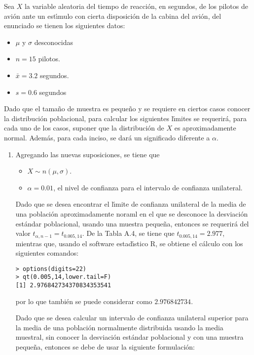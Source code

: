 \begin{solucion}
 Sea $X$ la variable aleatoria del tiempo de reacci\'on, en segundos, de los pilotos de avi\'on ante un est\'{\i}mulo con cierta disposici\'on de la cabina del avi\'on, del enunciado se tienen los siguientes datos:
 \begin{itemize}
  \item $\mu$ y $\sigma$ desconocidas
  \item $n = 15$ pilotos.
  \item $\bar{x} = 3.2$ segundos.
  \item $s = 0.6$ segundos
 \end{itemize}
 Dado que el tama\~no de muestra es peque\~no y se requiere en ciertos casos conocer la distribuci\'on poblacional, para calcular los siguientes l\'{\i}mites se requerir\'a, para cada uno de los casos, suponer que la distribuci\'on de $X$ es aproximadamente normal. Adem\'as, para cada inciso, se dar\'a un significado diferente a $\alpha$.
 \begin{enumerate}
  \item Agregando las nuevas suposiciones, se tiene que
  \begin{itemize}
   \item $X \sim n(\mu, \sigma)$.
   \item $\alpha = 0.01$, el nivel de confianza para el intervalo de confianza unilateral.
  \end{itemize}
  Dado que se desea encontrar el l\'{\i}mite de confianza unilateral de la media de una poblaci\'on aproximadamente noraml en el que se desconoce la desviaci\'on est\'andar poblacional, usando una muestra peque\~na, entonces se requerir\'a del valor $t_{\alpha,n-1} = t_{0.005,14}$. De la Tabla A.4, se tiene que $t_{0.005,14} = 2.977$, mientras que, usando el software estad\'{\i}stico R, se obtiene el c\'alculo con los siguientes comandos:
  \begin{verbatim}
> options(digits=22)
> qt(0.005,14,lower.tail=F)
[1] 2.976842734370834353541
  \end{verbatim}
  \vspace{-0.5cm}
  por lo que tambi\'en se puede considerar como $2.976842734$.
  \par 
  Dado que se desea calcular un intervalo de confianza unilateral superior para la media de una poblaci\'on normalmente distribuida usando la media muestral, sin conocer la desviaci\'on est\'andar poblacional y con una muestra peque\~na, entonces se debe de usar la siguiente formulaci\'on:
  \begin{equation*}

\end{equation*}
\end{enumerate}
\end{solucion}
